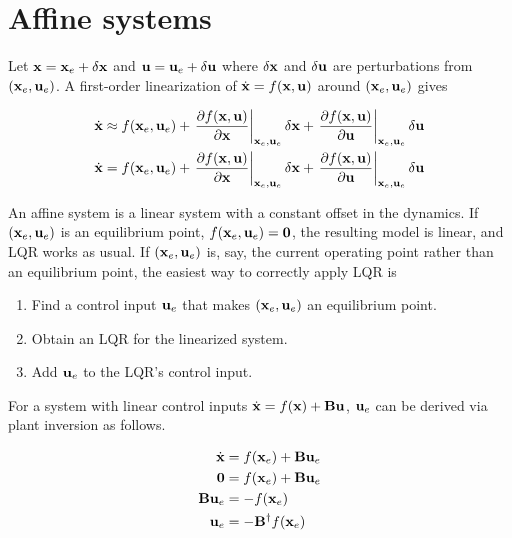\section{Affine systems}

Let $\mathbf{x} = \mathbf{x}_e + \delta\mathbf{x}$ and
$\mathbf{u} = \mathbf{u}_e + \delta\mathbf{u}$ where $\delta\mathbf{x}$ and $\delta\mathbf{u}$
are perturbations from $(\mathbf{x}_e, \mathbf{u}_e)$. A first-order linearization of
$\dot{\mathbf{x}} = f(\mathbf{x}, \mathbf{u})$ around $(\mathbf{x}_e, \mathbf{u}_e)$ gives

\begin{align*}
  \dot{\mathbf{x}} &\approx f(\mathbf{x}_e, \mathbf{u}_e) +
    \left.\frac{\partial f(\mathbf{x}, \mathbf{u})}{\partial \mathbf{x}}
    \right|_{\mathbf{x}_e, \mathbf{u}_e}\delta\mathbf{x} +
    \left.\frac{\partial f(\mathbf{x}, \mathbf{u})}{\partial \mathbf{u}}
    \right|_{\mathbf{x}_e, \mathbf{u}_e}\delta\mathbf{u} \\
  \dot{\mathbf{x}} &= f(\mathbf{x}_e, \mathbf{u}_e) +
    \left.\frac{\partial f(\mathbf{x}, \mathbf{u})}{\partial \mathbf{x}}
    \right|_{\mathbf{x}_e, \mathbf{u}_e}\delta\mathbf{x} +
    \left.\frac{\partial f(\mathbf{x}, \mathbf{u})}{\partial \mathbf{u}}
    \right|_{\mathbf{x}_e, \mathbf{u}_e}\delta\mathbf{u} \\
\end{align*}

An affine system is a linear system with a constant offset in the dynamics. If
$(\mathbf{x}_e, \mathbf{u}_e)$ is an equilibrium point,
$f(\mathbf{x}_e, \mathbf{u}_e) = \mathbf{0}$, the resulting \gls{model} is linear, and
LQR works as usual. If $(\mathbf{x}_e, \mathbf{u}_e)$ is, say, the current operating
point rather than an equilibrium point, the easiest way to correctly apply LQR
is

\begin{enumerate}
  \item Find a control input $\mathbf{u}_e$ that makes $(\mathbf{x}_e, \mathbf{u}_e)$ an
    equilibrium point.
  \item Obtain an LQR for the linearized system.
  \item Add $\mathbf{u}_e$ to the LQR's control input.
\end{enumerate}

For a system with linear control inputs
$\dot{\mathbf{x}} = f(\mathbf{x}) + \mathbf{B}\mathbf{u}$, $\mathbf{u}_e$ can be derived via
plant inversion as follows.

\begin{align}
  \dot{\mathbf{x}} &= f(\mathbf{x}_e) + \mathbf{B}\mathbf{u}_e \nonumber \\
  \mathbf{0} &= f(\mathbf{x}_e) + \mathbf{B}\mathbf{u}_e \nonumber \\
  \mathbf{B}\mathbf{u}_e &= -f(\mathbf{x}_e) \nonumber \\
  \mathbf{u}_e &= -\mathbf{B}^\dagger f(\mathbf{x}_e)
\end{align}

